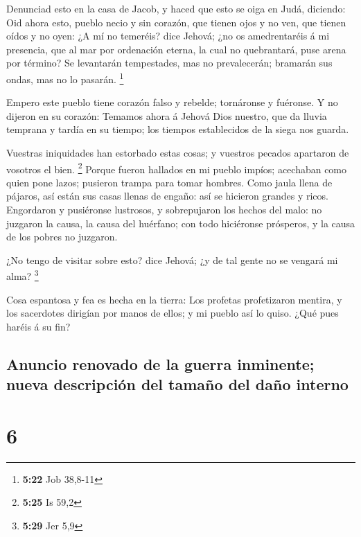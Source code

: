  Denunciad esto en la casa de Jacob, y haced que esto se
oiga en Judá, diciendo:  Oid ahora esto, pueblo necio y
sin corazón, que tienen ojos y no ven, que tienen oídos y no oyen:
 ¿A mí no temeréis? dice Jehová; ¿no os amedrentaréis á
mi presencia, que al mar por ordenación eterna, la cual no quebrantará,
puse arena por término? Se levantarán tempestades, mas no prevalecerán;
bramarán sus ondas, mas no lo pasarán. \footnote{\textbf{5:22} Job
  38,8-11}

 Empero este pueblo tiene corazón falso y rebelde;
tornáronse y fuéronse.  Y no dijeron en su corazón:
Temamos ahora á Jehová Dios nuestro, que da lluvia temprana y tardía en
su tiempo; los tiempos establecidos de la siega nos guarda.

 Vuestras iniquidades han estorbado estas cosas; y
vuestros pecados apartaron de vosotros el bien. \footnote{\textbf{5:25}
  Is 59,2}  Porque fueron hallados en mi pueblo impíos;
acechaban como quien pone lazos; pusieron trampa para tomar hombres.
 Como jaula llena de pájaros, así están sus casas llenas
de engaño: así se hicieron grandes y ricos.  Engordaron y
pusiéronse lustrosos, y sobrepujaron los hechos del malo: no juzgaron la
causa, la causa del huérfano; con todo hiciéronse prósperos, y la causa
de los pobres no juzgaron.

 ¿No tengo de visitar sobre esto? dice Jehová; ¿y de tal
gente no se vengará mi alma? \footnote{\textbf{5:29} Jer 5,9}

 Cosa espantosa y fea es hecha en la tierra:
 Los profetas profetizaron mentira, y los sacerdotes
dirigían por manos de ellos; y mi pueblo así lo quiso. ¿Qué pues haréis
á su fin?

\hypertarget{anuncio-renovado-de-la-guerra-inminente-nueva-descripciuxf3n-del-tamauxf1o-del-dauxf1o-interno}{%
\subsection{Anuncio renovado de la guerra inminente; nueva descripción
del tamaño del daño
interno}\label{anuncio-renovado-de-la-guerra-inminente-nueva-descripciuxf3n-del-tamauxf1o-del-dauxf1o-interno}}

\hypertarget{section-5}{%
\section{6}\label{section-5}}

